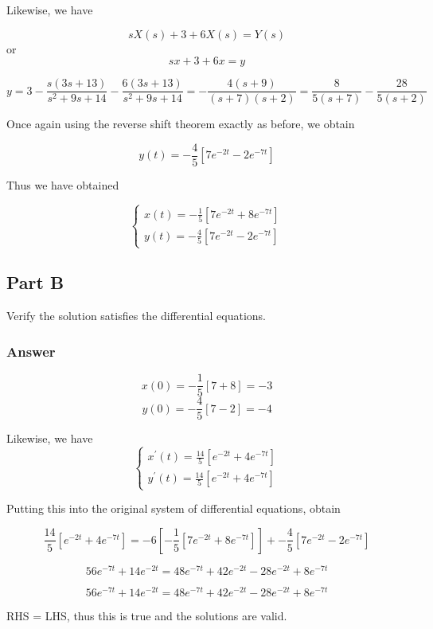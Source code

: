 \documentclass{article}
\begin{document}
Likewise, we have

$$sX(s)+3+6X(s)=Y(s)$$
or
$$sx+3+6x=y$$

$$y=3-\frac{s\left(3s+13\right)}{s^2+9s+14} -\frac{6\left(3s+13\right)}{s^2+9s+14} = - \frac{4\left(s+9\right)}{(s+7)(s+2)} = \frac{8}{5(s+7)}-\frac{28}{5(s+2)}$$

Once again using the reverse shift theorem exactly as before, we obtain

$$y(t) = -\frac{4}{5} \left[ 7e^{-2t}-2e^{-7t} \right]$$


Thus we have obtained

\[ \begin{cases}
x(t) = -\frac{1}{5} \left[ 7e^{-2t}+8e^{-7t}\right] \\
y(t) = -\frac{4}{5} \left[ 7e^{-2t}-2e^{-7t} \right]
\end{cases}
\]
\subsection*{Part B}
Verify the solution satisfies the differential equations.
\subsubsection*{Answer}

$$x(0) = -\frac{1}{5} \left[ 7+8 \right] = -3$$
$$y(0) = -\frac{4}{5} \left [ 7-2 \right] = -4$$

Likewise, we have
\[ \begin{cases}
x^{'}(t) = \frac{14}{5} \left[ e^{-2t}+4e^{-7t} \right] \\
y^{'}(t) = \frac{14}{5} \left[ e^{-2t}+4e^{-7t} \right]
\end{cases}
\]

Putting this into the original system of differential equations, obtain

$$  \frac{14}{5} \left[ e^{-2t}+4e^{-7t} \right] = -6 \left[ -\frac{1}{5} \left[ 7e^{-2t}+8e^{-7t}\right] \right ] +  -\frac{4}{5} \left[ 7e^{-2t}-2e^{-7t} \right]$$

$$ 56e^{-7t}+14e^{-2t}=48e^{-7t}+42e^{-2t}-28e^{-2t}+8e^{-7t} $$

$$56e^{-7t}+14e^{-2t}=48e^{-7t}+42e^{-2t}-28e^{-2t}+8e^{-7t}$$

RHS = LHS, thus this is true and the solutions are valid.
\end{document}
